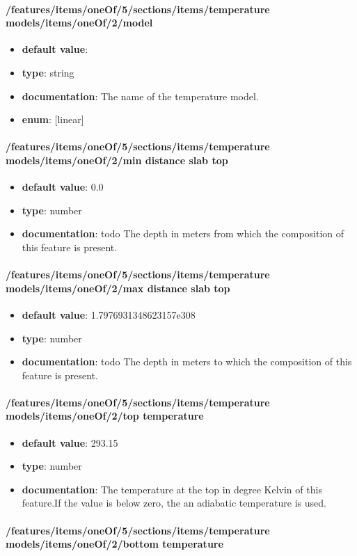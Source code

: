 \paragraph{/features/items/oneOf/5/sections/items/temperature models/items/oneOf/2/model}
\begin{itemize}\item {\bf default value}: 
\item {\bf type}: string
\item {\bf documentation}: The name of the temperature model.
\item {\bf enum}: [linear]\end{itemize}\paragraph{/features/items/oneOf/5/sections/items/temperature models/items/oneOf/2/min distance slab top}
\begin{itemize}\item {\bf default value}: 0.0
\item {\bf type}: number
\item {\bf documentation}: todo The depth in meters from which the composition of this feature is present.
\end{itemize}\paragraph{/features/items/oneOf/5/sections/items/temperature models/items/oneOf/2/max distance slab top}
\begin{itemize}\item {\bf default value}: 1.7976931348623157e308
\item {\bf type}: number
\item {\bf documentation}: todo The depth in meters to which the composition of this feature is present.
\end{itemize}\paragraph{/features/items/oneOf/5/sections/items/temperature models/items/oneOf/2/top temperature}
\begin{itemize}\item {\bf default value}: 293.15
\item {\bf type}: number
\item {\bf documentation}: The temperature at the top in degree Kelvin of this feature.If the value is below zero, the an adiabatic temperature is used.
\end{itemize}\paragraph{/features/items/oneOf/5/sections/items/temperature models/items/oneOf/2/bottom temperature}
